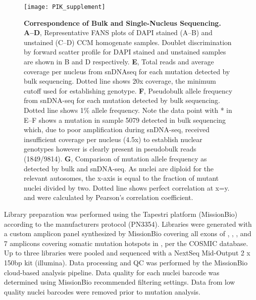 \begin{figure}[tbp!]
\begin{center}
\texttt{[image: PIK\_supplement]}
\end{center}
\caption[Correspondence of Bulk and Single-Nucleus Sequencing.] {\textbf{Correspondence of Bulk and Single-Nucleus Sequencing.} \\ \textbf{A--D}, Representative FANS plots of DAPI stained (A--B) and unstained (C--D) CCM homogenate samples. Doublet discrimination by forward scatter profile for DAPI stained and unstained samples are shown in B and D respectively. \textbf{E}, Total reads and average coverage per nucleus from snDNAseq for each mutation detected by bulk sequencing. Dotted line shows 20x coverage, the minimum cutoff used for establishing genotype. \textbf{F}, Pseudobulk allele frequency from snDNA-seq for each mutation detected by bulk sequencing. Dotted line shows 1\% allele frequency. Note the data point with * in E--F shows a mutation in sample 5079 detected in bulk sequencing which, due to poor amplification during snDNA-seq, received insufficient coverage per nucleus (4.5x) to establish nuclear genotypes however is clearly present in pseudobulk reads (1849/9814). \textbf{G}, Comparison of mutation allele frequency as detected by bulk and snDNA-seq. As nuclei are diploid for the relevant autosomes, the x-axis is equal to the fraction of mutant nuclei divided by two. Dotted line shows perfect correlation at x=y.  and  were calculated by Pearson’s correlation coefficient. }

\label{PIK_supplement}
\end{figure}

Library preparation was performed using the Tapestri platform (MissionBio) according to the manufacturers protocol (PN3354). Libraries were generated with a custom amplicon panel synthesized by MissionBio covering all exons of , , , and 7 amplicons covering somatic mutation hotspots in , per the COSMIC database. Up to three libraries were pooled and sequenced with a NextSeq Mid-Output 2 x 150bp kit (illumina). Data processing and QC was performed by the MissionBio cloud-based analysis pipeline. Data quality for each nuclei barcode was determined using MissionBio recommended filtering settings. Data from low quality nuclei barcodes were removed prior to mutation analysis. 
	
